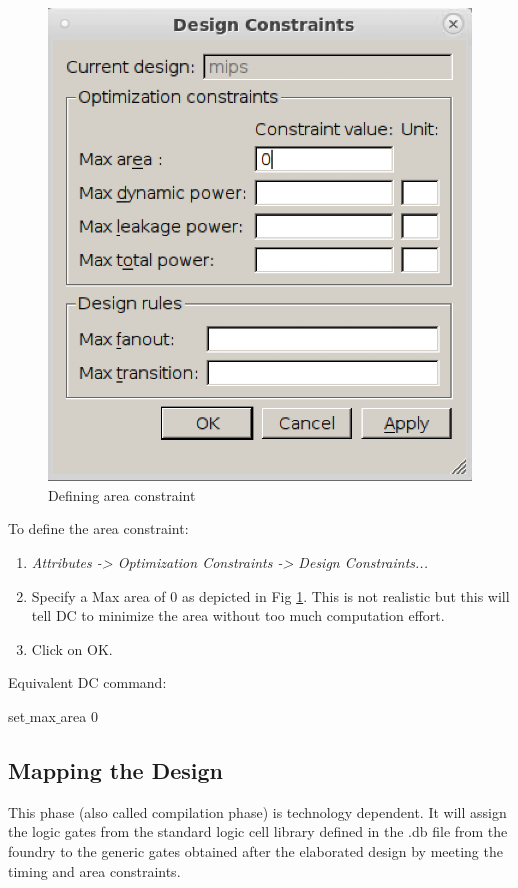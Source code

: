 	\parbox[t]{\dimexpr\textwidth-\leftmargin}{%
	\begin{figure}
		\vspace{0mm}
		\centering
		\vspace{-\baselineskip}
		\includegraphics[scale=0.37]{figures/lab3_design_compiler/area}
\caption{Defining area constraint}
\label{fig_area}
	\end{figure}
To define the area constraint:
\begin{enumerate}
	\item \textit{Attributes -> Optimization Constraints -> Design Constraints...}
	\item Specify a Max area of 0 as depicted in Fig \ref{fig_area}. This is not realistic but this will tell DC to minimize the area without too much computation effort.
	\item Click on OK.
\end{enumerate}
Equivalent DC command: 
\begin{codeline}
	set$\_$max$\_$area 0
\end{codeline}
}

\subsection{Mapping the Design}
This phase (also called compilation phase) is technology dependent. It will assign the logic gates from the standard logic cell library defined in the .db file from the foundry to the generic gates obtained after the elaborated design by meeting the timing and area constraints.\\

